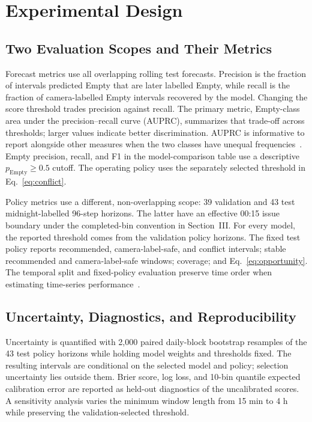 \section{Experimental Design}

\subsection{Two Evaluation Scopes and Their Metrics}

Forecast metrics use all overlapping rolling test forecasts. Precision is the fraction of intervals predicted Empty that are later labelled Empty, while recall is the fraction of camera-labelled Empty intervals recovered by the model. Changing the score threshold trades precision against recall. The primary metric, Empty-class area under the precision--recall curve (AUPRC), summarizes that trade-off across thresholds; larger values indicate better discrimination. AUPRC is informative to report alongside other measures when the two classes have unequal frequencies~\cite{SaitoRehmsmeier2015}. Empty precision, recall, and F1 in the model-comparison table use a descriptive $p_{\mathrm{Empty}}\geq0.5$ cutoff. The operating policy uses the separately selected threshold in Eq.~\eqref{eq:conflict}.

Policy metrics use a different, non-overlapping scope: 39 validation and 43 test midnight-labelled 96-step horizons. The latter have an effective 00:15 issue boundary under the completed-bin convention in Section~III. For every model, the reported threshold comes from the validation policy horizons. The fixed test policy reports recommended, camera-label-safe, and conflict intervals; stable recommended and camera-label-safe windows; coverage; and Eq.~\eqref{eq:opportunity}. The temporal split and fixed-policy evaluation preserve time order when estimating time-series performance~\cite{Cerqueira2020}.

\subsection{Uncertainty, Diagnostics, and Reproducibility}

Uncertainty is quantified with 2,000 paired daily-block bootstrap resamples of the 43 test policy horizons while holding model weights and thresholds fixed. The resulting intervals are conditional on the selected model and policy; selection uncertainty lies outside them. Brier score, log loss, and 10-bin quantile expected calibration error are reported as held-out diagnostics of the uncalibrated scores. A sensitivity analysis varies the minimum window length from 15 min to 4 h while preserving the validation-selected threshold.

